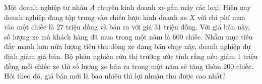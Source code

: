 \begin{bt}%
	Một doanh nghiệp tư nhân $A$ chuyên kinh doanh xe gắn máy các loại. Hiện nay doanh nghiệp đang tập trung vào chiến lược kinh doanh xe $X$ với chi phí mua vào một chiếc là 27 triệu đồng và bán ra với giá 31 triệu đồng. Với giá bán này, số lượng xe mà khách hàng đã mua trong một năm là 600 chiếc. Nhằm mục tiêu đẩy mạnh hơn nữa lượng tiêu thụ dòng xe đang bán chạy này, doanh nghiệp dự định giảm giá bán. Bộ phận nghiên cứu thị trường ước tính rằng nếu giảm 1 triệu đồng mỗi chiếc xe thì số lượng xe bán ra trong một năm sẽ tăng thêm 200 chiếc. Hỏi theo đó, giá bán mới là bao nhiêu thì lợi nhuận thu được cao nhất?
	\par
\end{bt}

